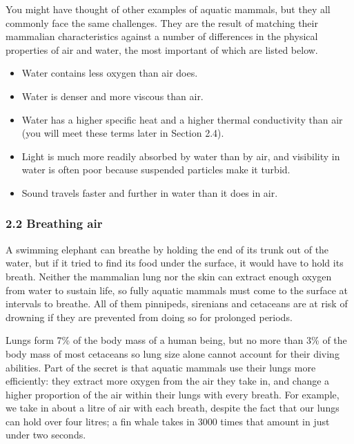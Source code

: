 \documentclass[letterpaper,10pt,english]{sphinxmanual}
\begin{document}
You might have thought of other examples of aquatic mammals, but they all commonly face the same challenges. They are the result of matching their mammalian characteristics against a number of differences in the physical properties of air and water, the most important of which are listed below.
\begin{itemize}
\item {} 
Water contains less oxygen than air does.

\item {} 
Water is denser and more viscous than air.

\item {} 
Water has a higher specific heat and a higher thermal conductivity than air (you will meet these terms later in Section 2.4).

\item {} 
Light is much more readily absorbed by water than by air, and visibility in water is often poor because suspended particles make it turbid.

\item {} 
Sound travels faster and further in water than it does in air.

\end{itemize}


\subsubsection{2.2 Breathing air}
\label{\detokenize{content/session_00/Part_00_02:2.2-Breathing-air}}
A swimming elephant can breathe by holding the end of its trunk out of the water, but if it tried to find its food under the surface, it would have to hold its breath. Neither the mammalian lung nor the skin can extract enough oxygen from water to sustain life, so fully aquatic mammals must come to the surface at intervals to breathe. All of them \textendash{} pinnipeds, sirenians and cetaceans \textendash{} are at risk of drowning if they are prevented from doing so for prolonged periods.

Lungs form 7\% of the body mass of a human being, but no more than 3\% of the body mass of most cetaceans \textendash{} so lung size alone cannot account for their diving abilities. Part of the secret is that aquatic mammals use their lungs more efficiently: they extract more oxygen from the air they take in, and change a higher proportion of the air within their lungs with every breath. For example, we take in about a litre of air with each breath, despite the fact that our lungs can hold over four litres; a
fin whale takes in 3000 times that amount in just under two seconds.
\end{document}

